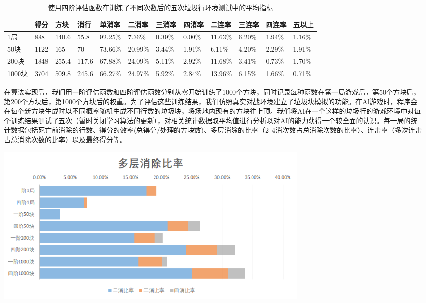 \documentclass[10pt,UTF8]{article}
\newenvironment{Figure}
  {\par\medskip\noindent\minipage{\linewidth}}
  {\endminipage\par\medskip}
\begin{document}
\begin{table}[h]
    \centering
    \caption{使用四阶评估函数在训练了不同次数后的五次垃圾行环境测试中的平均指标}
    \begin{tabular}{@{}llllllllllll@{}}
    \toprule
          & 得分   & 方块    & 消行    & 单消率     & 二消率     & 三消率    & 四消率    & 二连率     & 三连率    & 四连率    & 五以上    \\ \midrule
    1局    & 888  & 140.6 & 55.8  & 92.25\% & 7.36\%  & 0.39\% & 0.00\% & 11.63\% & 6.20\% & 1.94\% & 1.16\% \\
    50块   & 1122 & 165   & 70    & 73.66\% & 20.99\% & 3.44\% & 1.91\% & 6.11\%  & 4.20\% & 2.29\% & 1.91\% \\
    200块  & 1848 & 255.4 & 117.6 & 67.88\% & 24.09\% & 5.11\% & 2.92\% & 11.68\% & 3.41\% & 0.73\% & 1.70\% \\
    1000块 & 3704 & 509.8 & 245.6 & 66.27\% & 24.97\% & 5.92\% & 2.84\% & 13.96\% & 6.15\% & 1.66\% & 0.71\% \\ \bottomrule
    \end{tabular}
    \end{table}

\begin{multicols}{2}

在算法实现后，我们用一阶评估函数和四阶评估函数分别从零开始训练了1000个方块，同时记录每种函数在第一局游戏后，第50个方块后，第200个方块后，第1000个方块后的权重。为了评估这些训练结果，我们仿照真实对战环境建立了垃圾块模拟的功能。在AI游戏时，程序会在每个新方块生成时以不同概率随机生成不同行数的垃圾块，将场地内现有的方块往上顶。我们将AI在一个这样的垃圾行的游戏环境中对每个训练结果测试了五次（暂时关闭学习算法的更新），对相关统计数据取平均值进行分析以对AI的能力获得一个较全面的认识。每一局的统计数据包括死亡前消除的行数、得分的效率(总得分/处理的方块数)、多层消除的比率（2~4消次数占总消除次数的比率）、连击率（多次连击占总消除次数的比率）以及最终得分等。


\end{multicols}

\begin{Figure}
    \centering
    \includegraphics[width=0.7\textwidth]{figure/result1.png}
\end{Figure}
\end{document}
